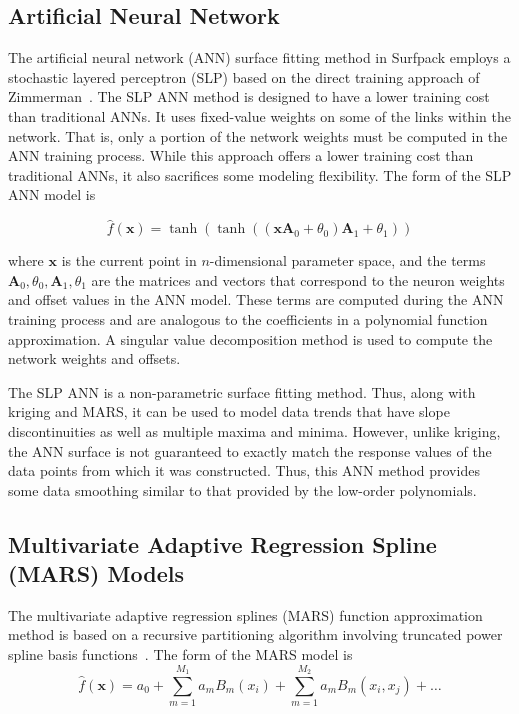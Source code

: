 \documentclass{article}
\begin{document}
\subsection{Artificial Neural Network}\label{models:surf:ann}

The artificial neural network (ANN) surface fitting method in Surfpack employs a stochastic layered
perceptron (SLP) based on the direct
training approach of Zimmerman~\cite{zimmerman}. The SLP ANN method is
designed to have a lower training cost than traditional ANNs.  It uses fixed-value weights on some of the links within the network. That is, only a portion of the network weights must be computed in the ANN training process.  While this approach offers a lower training cost than traditional ANNs, it also sacrifices some modeling flexibility.  The form of
the SLP ANN model is

\begin{equation}
  \hat{f}(\mathbf{x}) = 
  \tanh(\tanh((\mathbf{x A}_{0}+\theta_{0})\mathbf{A}_{1}+\theta_{1}))
  \label{models:surf:equation09}
\end{equation}

where $\mathbf{x}$ is the current point in $n$-dimensional parameter
space, and the terms
$\mathbf{A}_{0},\theta_{0},\mathbf{A}_{1},\theta_{1}$ are the matrices
and vectors that correspond to the neuron weights and offset values in
the ANN model. These terms are computed during the ANN training
process and are analogous to the coefficients in a polynomial function approximation.  A singular value decomposition method is used to compute the network weights and offsets.

The SLP ANN is a non-parametric surface fitting method. Thus, along
with kriging and MARS, it can be used to model data trends that have
slope discontinuities as well as multiple maxima and minima. However,
unlike kriging, the ANN surface is not guaranteed to exactly match the
response values of the data points from which it was constructed.  Thus, this ANN method provides some data smoothing similar to that provided by the low-order polynomials. 

\subsection{Multivariate Adaptive Regression Spline (MARS) Models}\label{models:surf:mars}

The multivariate adaptive regression splines (MARS) function approximation method is based on a recursive partitioning algorithm involving truncated power spline basis functions~\cite{friedman}.  The form of the MARS model is
\begin{equation}
  \hat{f}(\mathbf{x})= a_0 + \sum_{m=1}^{M_1}a_{m}B_{m}(x_i) +  \sum_{m=1}^{M_2}a_{m}B_{m}(x_i,x_j)+\ldots
  \label{models:surf:equation10}  
\end{equation}
\end{document}
